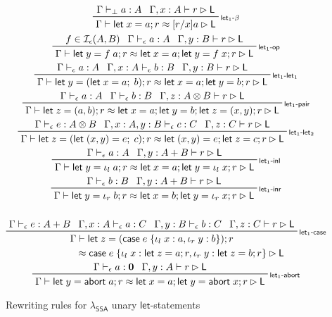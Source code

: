 \documentclass[acmsmall,screen,review]{acmart}
\newcommand{\mc}[1]{\ensuremath{\mathcal{#1}}}
\newcommand{\mb}[1]{\ensuremath{\mathbf{#1}}}
\newcommand{\ms}[1]{\ensuremath{\mathsf{#1}}}
\newcommand{\lto}{:}
\newcommand{\linl}[1]{\iota_l\;{#1}}
\newcommand{\linr}[1]{\iota_r\;{#1}}
\newcommand{\labort}[1]{\ms{abort}\;{#1}}
\newcommand{\letexpr}[3]{\ensuremath{\ms{let}\;#1 = #2;\;#3}}
\newcommand{\caseexpr}[5]{\ms{case}\;#1\;\{\linl{#2} \lto #3, \linr{#4} \lto #5\}}
\newcommand{\letstmt}[3]{\ensuremath{\ms{let}\;#1 = #2; #3}}
\newcommand{\casestmt}[5]{\ms{case}\;#1\;\{\linl{#2} \lto #3, \linr{#4} \lto #5\}}
\newcommand{\bhyp}[2]{#1 : #2}
\newcommand{\rle}[1]{{\scriptsize\textsf{#1}}}
\newcommand{\hasty}[4]{#1 \vdash_{#2} #3: {#4}}
\newcommand{\haslb}[3]{#1 \vdash #2 \rhd #3}
\newcommand{\isop}[4]{#1 \in \mc{I}_{#4}(#2, #3)}
\newcommand{\teqv}{\approx}
\newcommand{\lbeq}[4]{#1 \vdash #2 \teqv #3 \rhd {#4}}
\newcommand{\isotopessa}{\(\lambda_{\ms{SSA}}\)}
\begin{document}
\begin{figure}
  \begin{gather*}
    \prftree[r]{\rle{let$_1$-$\beta$}}
      {\hasty{\Gamma}{\bot}{a}{A}}
      {\haslb{\Gamma, \bhyp{x}{A}}{r}{\ms{L}}}
      {\lbeq{\Gamma}{\letstmt{x}{a}{r}}{[r/x]a}{\ms{L}}}
    \\
      \prftree[r]{\rle{let$_1$-op}}
      {\isop{f}{A}{B}{\epsilon}}
      {\hasty{\Gamma}{\epsilon}{a}{A}}
      {\haslb{\Gamma, \bhyp{y}{B}}{r}{\ms{L}}}
      {\lbeq{\Gamma}{\letstmt{y}{f\;a}{r}}{\letstmt{x}{a}{\letstmt{y}{f\;x}{r}}}{\ms{L}}}
    \\
    \prftree[r]{\rle{let$_{1}$-let$_1$}}
      {\hasty{\Gamma}{\epsilon}{a}{A}}
      {\hasty{\Gamma, \bhyp{x}{A}}{\epsilon}{b}{B}}
      {\haslb{\Gamma, \bhyp{y}{B}}{r}{\ms{L}}}
      {\lbeq{\Gamma}{\letstmt{y}{(\letexpr{x}{a}{b})}{r}}{\letstmt{x}{a}{\letstmt{y}{b}{r}}}{\ms{L}}}
    \\
    \prftree[r]{\rle{let$_1$-pair}}
      {\hasty{\Gamma}{\epsilon}{a}{A}}
      {\hasty{\Gamma}{\epsilon}{b}{B}}
      {\haslb{\Gamma, \bhyp{z}{A \otimes B}}{r}{\ms{L}}}
      {\lbeq{\Gamma}
        {\letstmt{z}{(a, b)}{r}}
        {\letstmt{x}{a}{\letstmt{y}{b}{\letstmt{z}{(x, y)}{r}}}}
        {\ms{L}}}
    \\
    \prftree[r]{\rle{let$_{1}$-let$_2$}}
      {\hasty{\Gamma}{\epsilon}{e}{A \otimes B}}
      {\hasty{\Gamma, \bhyp{x}{A}, \bhyp{y}{B}}{\epsilon}{c}{C}}
      {\haslb{\Gamma, \bhyp{z}{C}}{r}{\ms{L}}}
      {\lbeq{\Gamma}
        {\letstmt{z}{(\letexpr{(x, y)}{e}{c})}{r}}
        {\letstmt{(x, y)}{e}{\letstmt{z}{c}{r}}}
        {\ms{L}}}
    \\
    \prftree[r]{\rle{let$_1$-inl}}
      {\hasty{\Gamma}{\epsilon}{a}{A}}
      {\haslb{\Gamma, \bhyp{y}{A + B}}{r}{\ms{L}}}
      {\lbeq{\Gamma}{\letstmt{y}{\linl{a}}{r}}{\letstmt{x}{a}{\letstmt{y}{\linl{x}}{r}}}{\ms{L}}}
    \\
    \prftree[r]{\rle{let$_1$-inr}}
      {\hasty{\Gamma}{\epsilon}{b}{B}}
      {\haslb{\Gamma, \bhyp{y}{A + B}}{r}{\ms{L}}}
      {\lbeq{\Gamma}{\letstmt{y}{\linr{b}}{r}}{\letstmt{x}{b}{\letstmt{y}{\linr{x}}{r}}}{\ms{L}}}
    \\
    \\
    \prftree[r]{\rle{let$_1$-case}}
      {\hasty{\Gamma}{\epsilon}{e}{A + B}}
      {\hasty{\Gamma, \bhyp{x}{A}}{\epsilon}{a}{C}}
      {\hasty{\Gamma, \bhyp{y}{B}}{\epsilon}{b}{C}}
      {\haslb{\Gamma, \bhyp{z}{C}}{r}{\ms{L}}}
      { 
        \prfStackPremises
        {\Gamma \vdash \letstmt{z}{(\caseexpr{e}{x}{a}{y}{b})}{r}}
        {\hspace{6em} \teqv \casestmt{e}{x}{\letstmt{z}{a}{r}}{y}{\letstmt{z}{b}{r}} \rhd \ms{L}}
      }
    \\
    \prftree[r]{\rle{let$_1$-abort}}
      {\hasty{\Gamma}{\epsilon}{a}{\mb{0}}}
      {\haslb{\Gamma, \bhyp{y}{A}}{r}{\ms{L}}}
      {\lbeq{\Gamma}{\letstmt{y}{\labort{a}}{r}}
        {\letstmt{x}{a}{\letstmt{y}{\labort{x}}{r}}}{\ms{L}}}
  \end{gather*}
  \Description{}
  \caption{Rewriting rules for \isotopessa{} unary \ms{let}-statements}
  \label{fig:ssa-reg-unary-let}
\end{figure}
\end{document}
